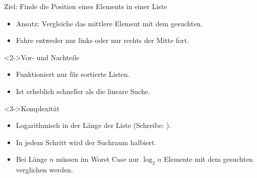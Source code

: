 \begin{frame}
    \begin{block}{Ziel: Finde die Position eines Elements in einer Liste}
        \begin{itemize}
            \item Ansatz: Vergleiche das mittlere Element mit dem gesuchten.
            \item Fahre entweder nur links oder nur rechts der Mitte fort.
        \end{itemize}
    \end{block}
    \begin{block}<2->{Vor- und Nachteile}
        \begin{itemize}
            \item Funktioniert nur für sortierte Listen.
            \item Ist erheblich schneller als die lineare Suche.
        \end{itemize}
    \end{block}
    \begin{block}<3->{Komplexität}
        \begin{itemize}
            \item Logarithmisch in der Länge der Liste (Schreibe: \alert{\olog}).
            \item In jedem Schritt wird der Suchraum halbiert.
            \item Bei Länge $n$ müssen im Worst Case nur $\log_{2}{n}$ Elemente mit dem gesuchten verglichen werden. 
        \end{itemize}
    \end{block}
\end{frame}
